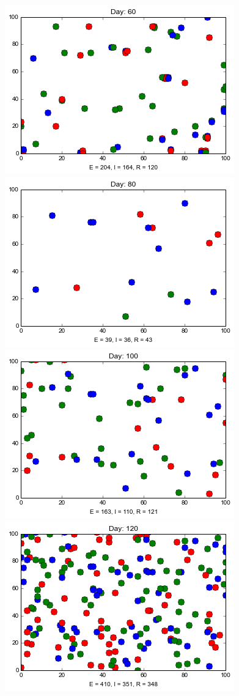 \begin{minipage}{\linewidth}
\medskip
\includegraphics[scale=0.28]{images/3t60.png} \quad
\includegraphics[scale=0.28]{images/3t80.png} \quad
\includegraphics[scale=0.28]{images/3t100.png} \quad
\includegraphics[scale=0.28]{images/3t120.png} 



\end{minipage}
